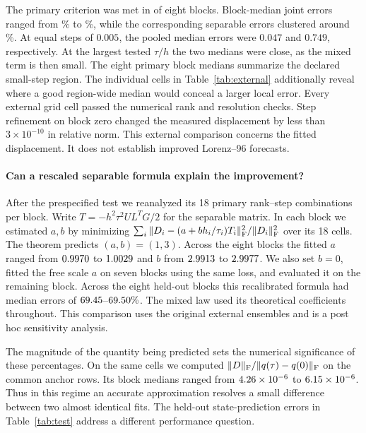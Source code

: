 The primary criterion was met in \ExternalPass{} of eight blocks. Block-median joint errors ranged from \JointPctLo\% to \JointPctHi\%, while the corresponding separable errors clustered around \SepMedianPct\%. At equal steps of $0.005$, the pooled median errors were $0.047$ and $0.749$, respectively. At the largest tested $\tau/h$ the two medians were close, as the mixed term is then small. The eight primary block medians summarize the declared small-step region. The individual cells in Table~\ref{tab:external} additionally reveal where a good region-wide median would conceal a larger local error. Every external grid cell passed the numerical rank and resolution checks. Step refinement on block zero changed the measured displacement by less than $3\times10^{-10}$ in relative norm. This external comparison concerns the fitted displacement. It does not establish improved Lorenz--96 forecasts.

\paragraph{Can a rescaled separable formula explain the improvement?}
After the prespecified test we reanalyzed its 18 primary rank--step combinations per block. Write $T=-h^2\tau^2 U L^TG/2$ for the separable matrix. In each block we estimated $a,b$ by minimizing $\sum_i\|D_i-(a+b h_i/\tau_i)T_i\|_{\mathrm F}^2/\|D_i\|_{\mathrm F}^2$ over its 18 cells. The theorem predicts $(a,b)=(1,3)$. Across the eight blocks the fitted $a$ ranged from $0.9970$ to $1.0029$ and $b$ from $2.9913$ to $2.9977$. We also set $b=0$, fitted the free scale $a$ on seven blocks using the same loss, and evaluated it on the remaining block. Across the eight held-out blocks this recalibrated formula had median errors of $69.45$--$69.50\%$. The mixed law used its theoretical coefficients throughout. This comparison uses the original external ensembles and is a post hoc sensitivity analysis.

The magnitude of the quantity being predicted sets the numerical significance of these percentages. On the same cells we computed $\|D\|_{\mathrm F}/\|q(\tau)-q(0)\|_{\mathrm F}$ on the common anchor rows. Its block medians ranged from $4.26\times10^{-6}$ to $6.15\times10^{-6}$. Thus in this regime an accurate approximation resolves a small difference between two almost identical fits. The held-out state-prediction errors in Table~\ref{tab:test} address a different performance question.
